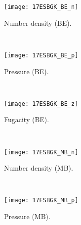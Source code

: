 \documentclass{rsproca}%
\begin{document}
\begin{figure}
        \centering
        \begin{subfigure}[b]{0.32\textwidth}
                \centering
                \texttt{[image: 17ESBGK\_BE\_n]}
                \caption{Number density (BE).}
                \label{fig:17ESBGK_BE_n}
        \end{subfigure}%
        ~ %
        \begin{subfigure}[b]{0.32\textwidth}
                \centering
                \texttt{[image: 17ESBGK\_BE\_p]}
                \caption{Pressure (BE).}
                \label{fig:17ESBGK_BE_p}
        \end{subfigure}
        ~ %
        \begin{subfigure}[b]{0.32\textwidth}
                \centering
                \texttt{[image: 17ESBGK\_BE\_z]}
                \caption{Fugacity (BE).}
                \label{fig:17ESBGK_BE_z}
        \end{subfigure}
				~ %
        \begin{subfigure}[b]{0.32\textwidth}
                \centering
                \texttt{[image: 17ESBGK\_MB\_n]}
                \caption{Number density (MB).}
                \label{fig:17ESBGK_MB_n}
        \end{subfigure}
        ~ %
        \begin{subfigure}[b]{0.32\textwidth}
                \centering
                \texttt{[image: 17ESBGK\_MB\_p]}
                \caption{Pressure (MB).}
                \label{fig:17ESBGK_MB_p}
        \end{subfigure}
				~ %
        \begin{subfigure}[b]{0.32\textwidth}

\end{subfigure}
\end{figure}
\end{document}
